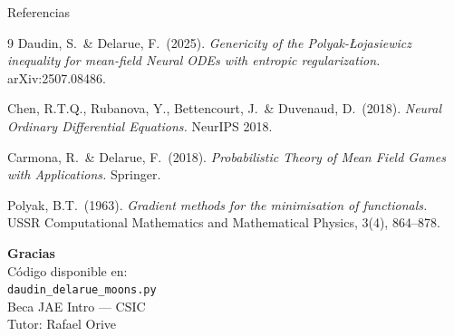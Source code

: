 \documentclass[10pt]{beamer}
\begin{document}
\begin{frame}{Referencias}

\begin{thebibliography}{9}
  Daudin, S.\ \& Delarue, F.\ (2025).
  \textit{Genericity of the Polyak-Łojasiewicz inequality for mean-field Neural ODEs with entropic regularization.}
  arXiv:2507.08486.

  Chen, R.T.Q., Rubanova, Y., Bettencourt, J.\ \& Duvenaud, D.\ (2018).
  \textit{Neural Ordinary Differential Equations.}
  NeurIPS 2018.

  Carmona, R.\ \& Delarue, F.\ (2018).
  \textit{Probabilistic Theory of Mean Field Games with Applications.}
  Springer.

  Polyak, B.T.\ (1963).
  \textit{Gradient methods for the minimisation of functionals.}
  USSR Computational Mathematics and Mathematical Physics, 3(4), 864--878.
\end{thebibliography}

\end{frame}

\begin{frame}{}
  \begin{center}
    \Large\textbf{Gracias}\\[1em]
    \normalsize
    Código disponible en:\\
    \texttt{daudin\_delarue\_moons.py}\\[1em]
    Beca JAE Intro — CSIC\\
    Tutor: Rafael Orive
  \end{center}
\end{frame}
\end{document}
